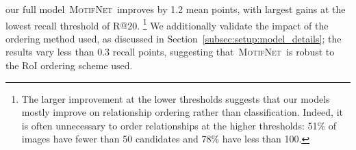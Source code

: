 \documentclass[10pt,twocolumn,letterpaper]{article}
\newcommand{\model}{\textsc{MotifNet}}
\begin{document}
our full model~\model~improves by 1.2 mean points, with largest gains at the lowest recall threshold of R$@$20. \footnote{The larger improvement at the lower thresholds suggests that our models mostly improve on relationship ordering rather than classification. Indeed, it is often unnecessary to order relationships at the higher thresholds: 51\% of images have fewer than 50 candidates and 78\% have less than 100.}
We additionally validate the impact of the ordering method used, as discussed in Section~\ref{subsec:setup:model_details}; the results vary less than 0.3 recall points, suggesting that~\model~is robust to the RoI ordering scheme used. 

\end{document}
